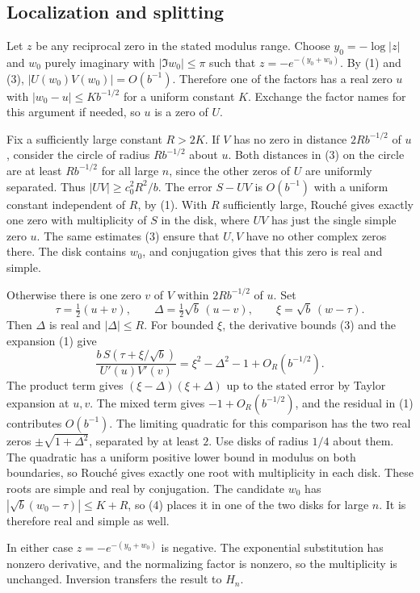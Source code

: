 \documentclass[11pt]{article}
\begin{document}
\subsection{Localization and splitting}

Let $z$ be any reciprocal zero in the stated modulus range. Choose $y_0=-\log|z|$ and $w_0$ purely imaginary with $|\Im w_0|\le\pi$ such that $z=-e^{-(y_0+w_0)}$. By (1) and (3), $|U(w_0)V(w_0)|=O(b^{-1})$. Therefore one of the factors has a real zero $u$ with $|w_0-u|\le Kb^{-1/2}$ for a uniform constant $K$. Exchange the factor names for this argument if needed, so $u$ is a zero of $U$.

Fix a sufficiently large constant $R>2K$. If $V$ has no zero in distance $2Rb^{-1/2}$ of $u$, consider the circle of radius $Rb^{-1/2}$ about $u$. Both distances in (3) on the circle are at least $Rb^{-1/2}$ for all large $n$, since the other zeros of $U$ are uniformly separated. Thus $|UV|\ge c_0^2R^2/b$. The error $S-UV$ is $O(b^{-1})$ with a uniform constant independent of $R$, by (1). With $R$ sufficiently large, Rouché gives exactly one zero with multiplicity of $S$ in the disk, where $UV$ has just the single simple zero $u$. The same estimates (3) ensure that $U,V$ have no other complex zeros there. The disk contains $w_0$, and conjugation gives that this zero is real and simple.

Otherwise there is one zero $v$ of $V$ within $2Rb^{-1/2}$ of $u$. Set
\[
 \tau=\tfrac12(u+v),\qquad
 \Delta=\tfrac12\sqrt b\,(u-v),\qquad
 \xi=\sqrt b\,(w-\tau).
\]
Then $\Delta$ is real and $|\Delta|\le R$. For bounded $\xi$, the derivative bounds (3) and the expansion (1) give
\[
 \frac{b\,S(\tau+\xi/\sqrt b)}{U'(u)V'(v)}
   =\xi^2-\Delta^2-1+O_R(b^{-1/2}).
 \tag{4}
\]
The product term gives $(\xi-\Delta)(\xi+\Delta)$ up to the stated error by Taylor expansion at $u,v$. The mixed term gives $-1+O_R(b^{-1/2})$, and the residual in (1) contributes $O(b^{-1})$. The limiting quadratic for this comparison has the two real zeros $\pm\sqrt{1+\Delta^2}$, separated by at least $2$. Use disks of radius $1/4$ about them. The quadratic has a uniform positive lower bound in modulus on both boundaries, so Rouché gives exactly one root with multiplicity in each disk. These roots are simple and real by conjugation. The candidate $w_0$ has $|\sqrt b(w_0-\tau)|\le K+R$, so (4) places it in one of the two disks for large $n$. It is therefore real and simple as well.

In either case $z=-e^{-(y_0+w_0)}$ is negative. The exponential substitution has nonzero derivative, and the normalizing factor is nonzero, so the multiplicity is unchanged. Inversion transfers the result to $H_n$.
\end{document}
